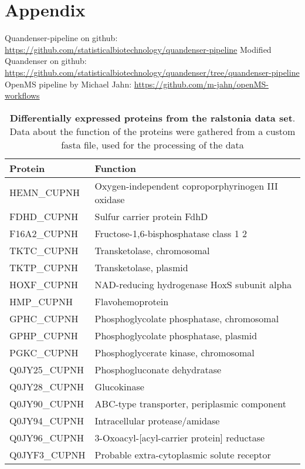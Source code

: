 \section{Appendix}

Quandenser-pipeline on github: \url{https://github.com/statisticalbiotechnology/quandenser-pipeline}
Modified Quandenser on github: \url{https://github.com/statisticalbiotechnology/quandenser/tree/quandenser-pipeline}
OpenMS pipeline by Michael Jahn: \url{https://github.com/m-jahn/openMS-workflows}


\begin{center}
\begin{longtable}{ l l }
\caption{\textbf{Differentially expressed proteins from the ralstonia data set}. Data about the function of the proteins were gathered from a custom fasta file, used for the processing of the data}\\
\toprule
Protein & Function \\ [0.5ex] \midrule
HEMN\_CUPNH & Oxygen-independent coproporphyrinogen III oxidase \\ [0.5ex]
FDHD\_CUPNH & Sulfur carrier protein FdhD \\ [0.5ex]
F16A2\_CUPNH & Fructose-1,6-bisphosphatase class 1 2 \\ [0.5ex]
TKTC\_CUPNH & Transketolase, chromosomal \\ [0.5ex]
TKTP\_CUPNH & Transketolase, plasmid \\ [0.5ex]
HOXF\_CUPNH & NAD-reducing hydrogenase HoxS subunit alpha \\ [0.5ex]
HMP\_CUPNH & Flavohemoprotein \\ [0.5ex]
GPHC\_CUPNH & Phosphoglycolate phosphatase, chromosomal \\ [0.5ex]
GPHP\_CUPNH & Phosphoglycolate phosphatase, plasmid \\ [0.5ex]
PGKC\_CUPNH & Phosphoglycerate kinase, chromosomal \\ [0.5ex]
Q0JY25\_CUPNH & Phosphogluconate dehydratase \\ [0.5ex]
Q0JY28\_CUPNH & Glucokinase \\ [0.5ex]
Q0JY90\_CUPNH & ABC-type transporter, periplasmic component \\ [0.5ex]
Q0JY94\_CUPNH & Intracellular protease/amidase \\ [0.5ex]
Q0JY96\_CUPNH & 3-Oxoacyl-[acyl-carrier protein] reductase \\ [0.5ex]
Q0JYF3\_CUPNH & Probable extra-cytoplasmic solute receptor \\ [0.5ex]

\end{longtable}
\end{center}
